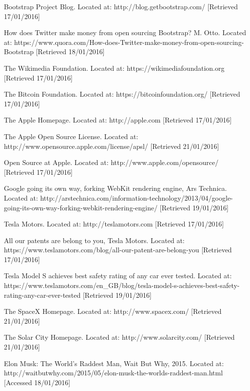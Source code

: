 \begin{thebibliography}{100}
 Bootstrap Project Blog.
  Located at: http://blog.getbootstrap.com/ [Retrieved 17/01/2016]

 How does Twitter make money from open sourcing Bootstrap?
  M. Otto.
  Located at: https://www.quora.com/How-does-Twitter-make-money-from-open-sourcing-Bootstrap [Retrieved 18/01/2016]

 The Wikimedia Foundation.
  Located at: https://wikimediafoundation.org [Retrieved 17/01/2016]

 The Bitcoin Foundation.
  Located at: https://bitcoinfoundation.org/ [Retrieved 17/01/2016]

 The Apple Homepage.
  Located at: http://apple.com [Retrieved 17/01/2016]
  
  The Apple Open Source License.
  Located at: http://www.opensource.apple.com/license/apsl/  [Retrieved 21/01/2016]

 Open Source at Apple.
  Located at: http://www.apple.com/opensource/ [Retrieved 17/01/2016]

 Google going its own way, forking WebKit rendering engine,
    Ars Technica.
    Located at: http://arstechnica.com/information-technology/2013/04/google-going-its-own-way-forking-webkit-rendering-engine/ [Retrieved 19/01/2016]

 Tesla Motors.
  Located at: http://teslamotors.com [Retrieved 17/01/2016]

 All our patents are belong to you,
  Tesla Motors.
  Located at: https://www.teslamotors.com/blog/all-our-patent-are-belong-you [Retrieved 17/01/2016]

 Tesla Model S achieves best safety rating of any car ever tested.
	Located at: https://www.teslamotors.com/en\_GB/blog/tesla-model-s-achieves-best-safety-rating-any-car-ever-tested [Retrieved 19/01/2016]

  The SpaceX Homepage.
  Located at: http://www.spacex.com/  [Retrieved 21/01/2016]
  
  The Solar City Homepage.
  Located at: http://www.solarcity.com/  [Retrieved 21/01/2016]

 Elon Musk: The World's Raddest Man,
    Wait But Why,
    2015.
	Located at: http://waitbutwhy.com/2015/05/elon-musk-the-worlds-raddest-man.html [Accessed 18/01/2016]


\end{thebibliography}
